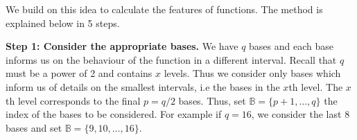 \documentclass[12pt]{book} %
\begin{document}

We build on this idea to calculate the features of functions. The method is explained below in 5 steps.



{\bf Step 1: Consider the appropriate bases.} We have $q$ bases and each base informs us on the behaviour of the function in a different interval. Recall that $q$ must be a power of 2 and contains $x$ levels. Thus we consider only bases which inform us of details on the smallest intervals, i.e the bases in the $x$th level. The $x$th level corresponds to the final $p = q/2$ bases. Thus, set $\mathbb{B} = \{p+1, \dots, q\}$ the index of the bases to be considered. For example if $q=16$, we consider the last 8 bases and set $\mathbb{B} = \{9, 10, \dots, 16\}$.
\end{document}
